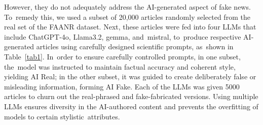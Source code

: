 \documentclass[electronics,article,accept,pdftex,moreauthors,electronics]{Definitions/mdpi}
\begin{document}
However, they do not adequately address the AI-generated aspect of fake news. To~remedy this, we used a subset of 20,000 articles randomly selected from the real set of the FAANR dataset. Next, these articles were fed into four LLMs that include ChatGPT-4o, Llama3.2, gemma, and~mistral, to~produce respective AI-generated articles using carefully designed scientific prompts, as~shown in Table~\ref{tab1}. In~order to ensure carefully controlled prompts, in one subset, the~model was instructed to maintain factual accuracy and coherent style, yielding AI Real; in the other subset, it was guided to create deliberately false or misleading information, forming AI Fake. Each of the LLMs was given 5000 articles to churn out the real-phrased and fake-fabricated versions. Using multiple LLMs ensures diversity in the AI-authored content and prevents the overfitting of models to certain stylistic~attributes.
\end{document}
